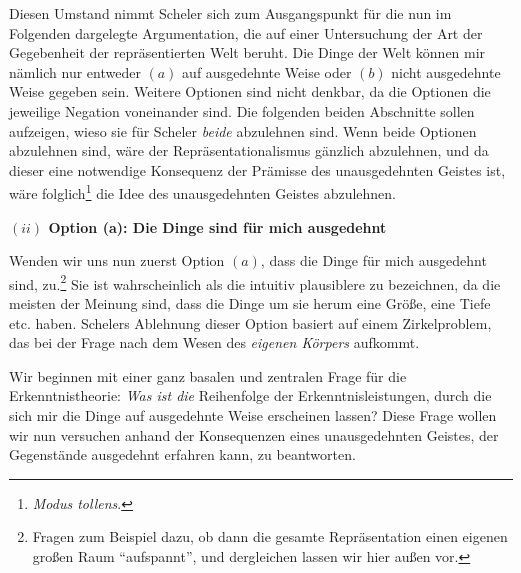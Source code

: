 \documentclass[a4paper, 12pt]{article}
\begin{document}
\begin{onehalfspace}

Diesen Umstand nimmt Scheler sich zum Ausgangspunkt für die nun im Folgenden dargelegte Argumentation, die auf einer Untersuchung der Art der Gegebenheit der repräsentierten Welt beruht. Die Dinge der Welt können mir nämlich nur entweder $(a)$ auf ausgedehnte Weise oder $(b)$ nicht ausgedehnte Weise gegeben sein. Weitere Optionen sind nicht denkbar, da die Optionen die jeweilige Negation voneinander sind. Die folgenden beiden Abschnitte sollen aufzeigen, wieso sie für Scheler \emph{beide} abzulehnen sind. Wenn beide Optionen abzulehnen sind, wäre der Repräsentationalismus gänzlich abzulehnen, und da dieser eine notwendige Konsequenz der Prämisse des unausgedehnten Geistes ist, wäre folglich\footnote{\emph{Modus tollens}.} die Idee des unausgedehnten Geistes abzulehnen.

\vspace{5mm}
\noindent\textbf{$(ii)$ Option (a): Die Dinge sind für mich ausgedehnt}


\noindent Wenden wir uns nun zuerst Option $(a)$, dass die Dinge für mich ausgedehnt sind, zu.\footnote{Fragen zum Beispiel dazu, ob dann die gesamte Repräsentation einen eigenen großen Raum "`aufspannt"', und dergleichen lassen wir hier außen vor.} Sie ist wahrscheinlich als die intuitiv plausiblere zu bezeichnen, da die meisten der Meinung sind, dass die Dinge um sie herum eine Größe, eine Tiefe etc. haben. Schelers Ablehnung dieser Option basiert auf einem Zirkelproblem, das bei der Frage nach dem Wesen des \emph{eigenen Körpers} aufkommt.


Wir beginnen mit einer ganz basalen und zentralen Frage für die Erkenntnistheorie: \emph{Was ist die} Reihenfolge der Erkenntnisleistungen, durch die sich mir die Dinge auf ausgedehnte Weise erscheinen lassen? Diese Frage wollen wir nun versuchen anhand der Konsequenzen eines unausgedehnten Geistes, der Gegenstände ausgedehnt erfahren kann, zu beantworten. 


\end{onehalfspace}
\end{document}
